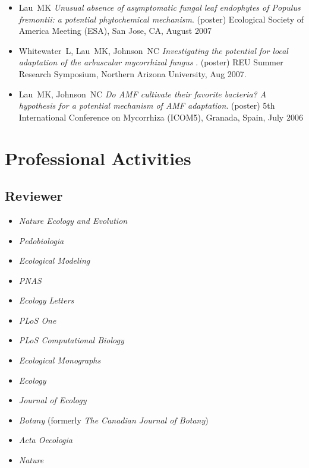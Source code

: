 \documentclass[a4paper]{article}
\begin{document}
\begin{itemize}
{  host species fidelity in woody plants of Arizona riparian forests.}
  Ecological Society of America Meeting (ESA), Milwaukee, WI, August
  2008
\item
  Lau~MK \emph{Unusual absence of asymptomatic fungal leaf endophytes of
  Populus fremontii: a potential phytochemical mechanism}. (poster)
  Ecological Society of America Meeting (ESA), San Jose, CA, August 2007
\item
  Whitewater~L, Lau~MK, Johnson~NC \emph{Investigating the potential for
  local adaptation of the arbuscular mycorrhizal fungus} . (poster) REU
  Summer Research Symposium, Northern Arizona University, Aug 2007.
\item
  Lau~MK, Johnson~NC \emph{Do AMF cultivate their favorite bacteria? A
  hypothesis for a potential mechanism of AMF adaptation}. (poster) 5th
  International Conference on Mycorrhiza (ICOM5), Granada, Spain, July
  2006

\end{itemize}

\section{Professional Activities}\label{professional-activities}

\subsection{Reviewer}\label{article-reviewer}

\begin{itemize}
\item
  \emph{Nature Ecology and Evolution}
\item
  \emph{Pedobiologia}
\item
  \emph{Ecological Modeling}
\item
  \emph{PNAS}
\item
  \emph{Ecology Letters}
\item
  \emph{PLoS One}
\item
  \emph{PLoS Computational Biology}
\item
  \emph{Ecological Monographs}
\item
  \emph{Ecology}
\item
  \emph{Journal of Ecology}
\item
  \emph{Botany} (formerly \emph{The Canadian Journal of Botany})
\item
  \emph{Acta Oecologia}
\item
  \emph{Nature}
\end{itemize}
\end{document}
